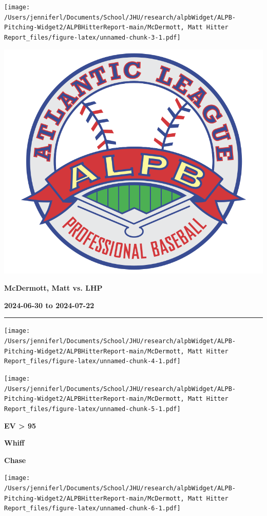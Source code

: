 \documentclass[
]{article}
\begin{document}
\texttt{[image: /Users/jenniferl/Documents/School/JHU/research/alpbWidget/ALPB-Pitching-Widget2/ALPBHitterReport-main/McDermott, Matt Hitter Report\_files/figure-latex/unnamed-chunk-3-1.pdf]}

\newpage
\begin{multicols}{3}

\includegraphics[width=0.4\columnwidth]{ALPB_Logo}

\hspace{0pt}
\vfill
\hspace{-0.5in}\large\textbf{McDermott, Matt vs. LHP}
\vfill
\hspace{0pt}

\hspace{0pt}
\vfill
\large\textbf{2024-06-30 to 2024-07-22}
\vfill
\hspace{0pt}

\end{multicols}
\vspace{-0.35in}

\noindent

\rule{\textwidth}{0.75pt}

\texttt{[image: /Users/jenniferl/Documents/School/JHU/research/alpbWidget/ALPB-Pitching-Widget2/ALPBHitterReport-main/McDermott, Matt Hitter Report\_files/figure-latex/unnamed-chunk-4-1.pdf]}

\texttt{[image: /Users/jenniferl/Documents/School/JHU/research/alpbWidget/ALPB-Pitching-Widget2/ALPBHitterReport-main/McDermott, Matt Hitter Report\_files/figure-latex/unnamed-chunk-5-1.pdf]}

\begin{multicols}{3}



\hspace{0.2in}\centerline{\LARGE\textbf{EV > 95}}



\hspace{-0.05in}\centerline{\LARGE\textbf{Whiff}}



\hspace{-0.05in}\centerline{\LARGE\textbf{Chase}}
\end{multicols}

\texttt{[image: /Users/jenniferl/Documents/School/JHU/research/alpbWidget/ALPB-Pitching-Widget2/ALPBHitterReport-main/McDermott, Matt Hitter Report\_files/figure-latex/unnamed-chunk-6-1.pdf]}
\end{document}
